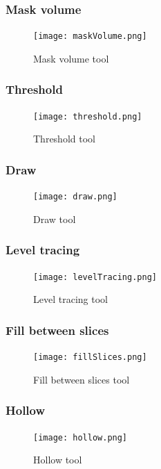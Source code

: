 \subsubsection{Mask volume}
\begin{figure}[h!]
	\centerline{
		\texttt{[image: maskVolume.png]}}
	\caption{Mask volume tool}\label{fig:mv}
\end{figure}


\subsubsection{Threshold}
\begin{figure}[h!]
	\centerline{
		\texttt{[image: threshold.png]}}
	\caption{Threshold tool}\label{fig:threshold}
\end{figure}



\subsubsection{Draw}
\begin{figure}[h!]
	\centerline{
		\texttt{[image: draw.png]}}
	\caption{Draw tool}\label{fig:draw}
\end{figure}



\subsubsection{Level tracing}
\begin{figure}[h!]
	\centerline{
		\texttt{[image: levelTracing.png]}}
	\caption{Level tracing tool}\label{fig:lT}
\end{figure}



\subsubsection{Fill between slices}
\begin{figure}[h!]
	\centerline{
		\texttt{[image: fillSlices.png]}}
	\caption{Fill between slices tool}\label{fig:fS}
\end{figure}



\subsubsection{Hollow}
\begin{figure}[h!]
	\centerline{
		\texttt{[image: hollow.png]}}
	\caption{Hollow tool}\label{fig:hollow}
\end{figure}



